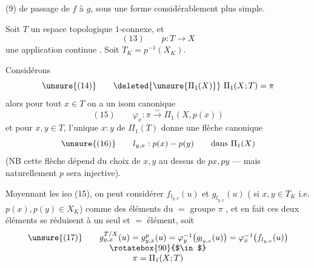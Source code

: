(9) de passage de $f$ à $g$, sous une forme considérablement plus simple.

Soit $T$ un espace topologique  $1$-connexe, et
\[
(13)\qquad p:T\longrightarrow X
\]
une application continue . Soit $T_K=p^{-1}(X_K)$.

Considérons 
\[
\unsure{(14)}\qquad\deleted{\unsure{\Pi_1(X)}}\ \Pi_1(X;T)=\pi
\]
alors pour tout $x\in T$ on a un isom canonique
\[
(15)\qquad\varphi_x:\pi\xrightarrow{\sim}\Pi_1(X,p(x))
\]
et pour $x,y\in T$, l'unique    $x:y$ de $\Pi_1(T)$ donne  une flèche canonique
\[
\unsure{(16)}\qquad l_{y,x}:p(x)\mathbin{-}p(y)\qquad\text{dans }\Pi_1(X)
\]
(NB cette flèche dépend du choix de $x,y$ au dessus de $px,py$ --- mais naturellement $p$ sera injective).

Moyennant les iso (15), on peut considérer $f_{l_{y,x}}(u)$ et $g_{l_{y,x}}(u)$ ( si $x,y\in T_K$ i.e. $p(x),p(y)\in X_K$) comme des éléments du $=$ groupe $\pi$ ,  et en fait ces deux éléments se réduisent à un seul et $=$ élément, soit
\[
\begin{array}{c}
\unsure{(17)}\qquad g_{y,x}^{T/X}(u)=g_{y,x}^{p}(u)=\varphi_y^{-1}\bigl(g_{l_{y,x}}(u)\bigr)=\varphi_x^{-1}\bigl(f_{l_{y,x}}(u)\bigr)\\
\rotatebox{90}{$\in$}\\
\pi=\Pi_1(X;T)
\end{array}
\]
